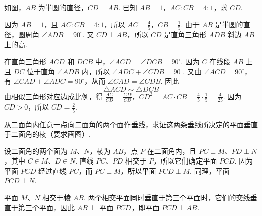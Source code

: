 \begin{problem}
如图，\(AB\) 为半圆的直径，\(CD\perp AB\). 已知 \(AB=1\)，\(AC:CB=4:1\)，求 \(CD\).

\end{problem}

\begin{solution}
因为 \(AB=1\)，且 \(AC:CB=4:1\)，所以 \(AC=\frac45\)，\(CB=\frac15\).
由于 \(AB\) 是半圆的直径，圆周角 \(\angle ADB=90^\circ\). 又 \(CD\perp AB\)，所以 \(CD\) 是直角三角形 \(ADB\) 斜边 \(AB\) 上的高.

在直角三角形 \(ACD\) 和 \(DCB\) 中，\(\angle ACD=\angle DCB=90^\circ\). 因为 \(C\) 在线段 \(AB\) 上且 \(DC\) 位于直角 \(\angle ADB\) 内，所以 \(\angle ADC+\angle CDB=90^\circ\). 又由 \(\angle ACD=90^\circ\)，有 \(\angle CAD+\angle ADC=90^\circ\)，从而 \(\angle CAD=\angle CDB\). 因此
\[
\triangle ACD\sim\triangle DCB
\]
由相似三角形对应边成比例，得
\(\frac{AC}{CD}=\frac{CD}{CB}\)，\(CD^2=AC\cdot CB =\frac45\cdot\frac15=\frac4{25}\).
因为 \(CD>0\)，所以 \(CD=\frac25\).

\end{solution}

\begin{problem}
从二面角内任意一点向二面角的两个面作垂线，求证这两条垂线所决定的平面垂直于二面角的棱（要求画图）.
\end{problem}

\begin{solution}
设二面角的两个面为 \(M\)、\(N\)，棱为 \(AB\)，点 \(P\) 在二面角内，且 \(PC\perp M\)、\(PD\perp N\)，其中 \(C\in M\)、\(D\in N\). 直线 \(PC\)、\(PD\) 相交于 \(P\)，所以它们确定平面 \(PCD\). 因为平面 \(PCD\) 经过直线 \(PC\)，而 \(PC\perp M\)，所以平面 \(PCD\perp M\). 同理，平面 \(PCD\perp N\).

平面 \(M\)、\(N\) 相交于棱 \(AB\). 两个相交平面同时垂直于第三个平面时，它们的交线垂直于第三个平面，因此 \(AB\perp\) 平面 \(PCD\)，即平面 \(PCD\perp AB\).

\end{solution}

